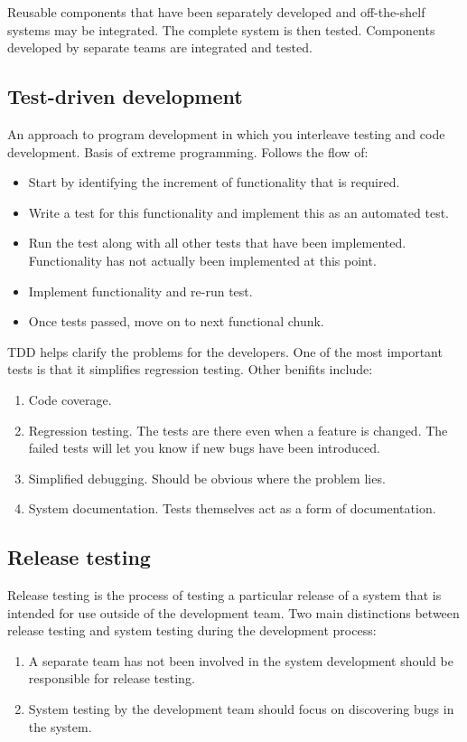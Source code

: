 \documentclass{article}
\begin{document}
Reusable components that have been separately developed and off-the-shelf systems may be integrated.  The complete system is then tested.
Components developed by separate teams are integrated and tested.

\subsection{Test-driven development}
An approach to program development in which you interleave testing and code development.  Basis of extreme programming.
Follows the flow of:
\begin{itemize}
    \item Start by identifying the increment of functionality that is required.
    \item Write a test for this functionality and implement this as an automated test.
    \item Run the test along with all other tests that have been implemented.  Functionality has not actually been implemented at this point.
    \item Implement functionality and re-run test.
    \item Once tests passed, move on to next functional chunk.
\end{itemize}
TDD helps clarify the problems for the developers.  
One of the most important tests is that it simplifies regression testing.
Other benifits include:
\begin{enumerate}
    \item Code coverage.
    \item Regression testing.  The tests are there even when a feature is changed.  The failed tests will let you know if new bugs have been introduced.
    \item Simplified debugging.  Should be obvious where the problem lies.
    \item System documentation.  Tests themselves act as a form of documentation.
\end{enumerate}

\subsection{Release testing}
Release testing is the process of testing a particular release of a system that is intended for use outside of the development team.
Two main distinctions between release testing and system testing during the development process:
\begin{enumerate}
    \item A separate team has not been involved in the system development should be responsible for release testing.
    \item System testing by the development team should focus on discovering bugs in the system.
\end{enumerate}
\end{document}
